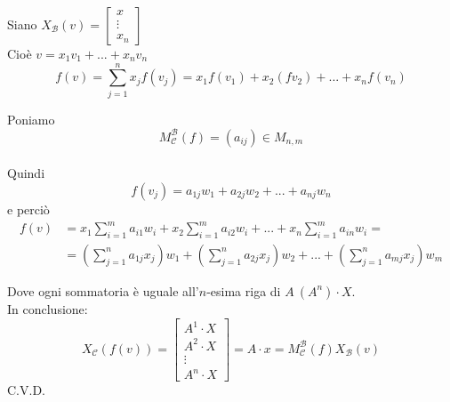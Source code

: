 \begin{dimostrazione}
    Siano $X_{\mathscr{B}}(v)=\left[\begin{smallmatrix}
        x \\ \vdots \\ x_n
    \end{smallmatrix}\right]$ \\
    Cioè $v=x_1v_1+...+x_nv_n$
    \begin{equation}
        f(v)=\sum_{j=1}^{n}x_jf(v_j)=x_1f(v_1)+x_2(fv_2)+...+x_nf(v_n)
    \end{equation}

    Poniamo
    \begin{equation}
        M_{\mathscr{C}}^{\mathscr{B}}(f) = (a_{ij})\in M_{n,m}
    \end{equation}
    \\
    Quindi
    \begin{equation}
        f(v_j)=a_{1j}w_1+a_{2j}w_2+...+a_{nj}w_n
    \end{equation}
    e perciò
    \begin{align}
         f(v) &= x_1 \sum_{i=1}^{m}a_{i1}w_i+x_2 \sum_{i=1}^{m}a_{i2}w_i+...+ x_n \sum_{i=1}^{m}a_{in}w_i = \\
        &= (\sum_{j=1}^{n}a_{1j}x_j)w_1 + (\sum_{j=1}^{n}a_{2j}x_j)w_2 + ... + (\sum_{j=1}^{n}a_{mj}x_j)w_m
    \end{align}

    Dove ogni sommatoria è uguale all'$n$-esima riga di $A\ (A^n)\cdot X$. \\
    In conclusione:
    \begin{equation}
        X_{\mathscr{C}}(f(v)) = \begin{bmatrix}
            A^1 \cdot X \\
            A^2 \cdot X \\
            \vdots \\
            A^n\cdot X
        \end{bmatrix} = A\cdot x = M_{\mathscr{C}}^{\mathscr{B}}(f)X_{\mathscr{B}}(v)
    \end{equation}
    C.V.D.
\end{dimostrazione}

\leavevmode \\
\leavevmode \\

